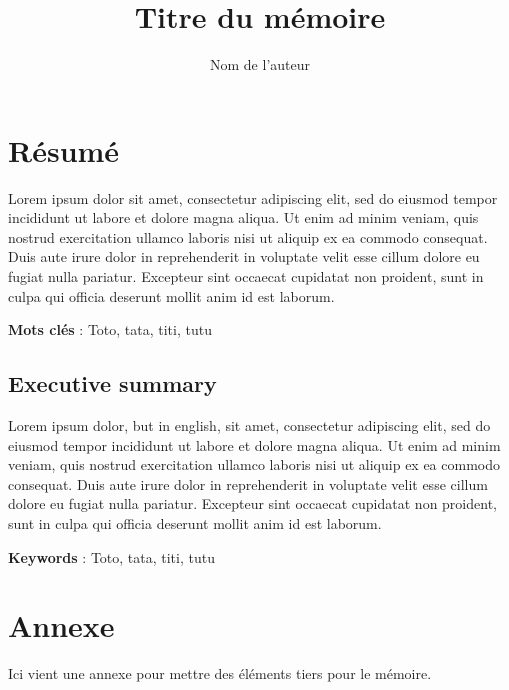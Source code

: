 \documentclass{report}
\title{Titre du mémoire}
\author{Nom de l'auteur}
\begin{document}



\chapter*{Résumé}

\par
Lorem ipsum dolor sit amet, consectetur adipiscing elit, sed do eiusmod tempor incididunt ut labore et dolore magna aliqua. Ut enim ad minim veniam, quis nostrud exercitation ullamco laboris nisi ut aliquip ex ea commodo consequat. Duis aute irure dolor in reprehenderit in voluptate velit esse cillum dolore eu fugiat nulla pariatur. Excepteur sint occaecat cupidatat non proident, sunt in culpa qui officia deserunt mollit anim id est laborum.

\medskip
 \textbf{Mots clés} : Toto, tata, titi, tutu

\section*{Executive summary}
Lorem ipsum dolor, but in english, sit amet, consectetur adipiscing elit, sed do eiusmod tempor incididunt ut labore et dolore magna aliqua. Ut enim ad minim veniam, quis nostrud exercitation ullamco laboris nisi ut aliquip ex ea commodo consequat. Duis aute irure dolor in reprehenderit in voluptate velit esse cillum dolore eu fugiat nulla pariatur. Excepteur sint occaecat cupidatat non proident, sunt in culpa qui officia deserunt mollit anim id est laborum.


\medskip
\textbf{Keywords} : Toto, tata, titi, tutu

\tableofcontents








\printbibliography

%



\chapter*{Annexe}

Ici vient une annexe pour mettre des éléments tiers pour le mémoire.

\end{document}
